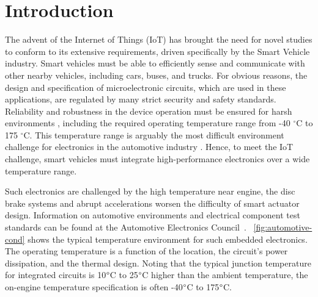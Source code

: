 
\chapter{Introduction}  %

\ifpdf
    \graphicspath{{Chapter1/Figs/Raster/}{Chapter1/Figs/PDF/}{Chapter1/Figs/}}
\else
    \graphicspath{{Chapter1/Figs/Vector/}{Chapter1/Figs/}}
\fi

The advent of the Internet of Things (IoT) has brought the need for novel studies to conform to its extensive requirements, driven specifically by the Smart Vehicle industry.   Smart vehicles must be able to efficiently sense and communicate with other nearby vehicles, including cars, buses, and trucks. For obvious reasons, the design and specification of microelectronic circuits, which are used in these applications, are regulated by many strict security and safety standards. Reliability and robustness in the device operation must be ensured for harsh environments \cite{Ferreira2014}, including the required operating temperature range from -40 $^{\circ}$C to 175 $^{\circ}$C. This temperature range is arguably the most difficult environment challenge for electronics in the automotive industry \cite{Chain1997}. Hence, to meet the IoT challenge, smart vehicles must integrate high-performance electronics over a wide temperature range.

Such electronics are challenged by the high temperature near engine, the disc brake systems and abrupt accelerations worsen the difficulty of smart actuator design. Information on automotive environments and electrical component test standards can be found at the Automotive Electronics Council~\cite{1393072,ISO16750}. \figurename~\ref{fig:automotive-cond} shows the typical temperature environment for such embedded electronics. The operating temperature is a function of the location, the circuit's power dissipation, and the thermal design. Noting that the typical junction temperature for integrated circuits is 10\(\degree \)C to 25\(\degree \)C higher than the ambient temperature, the on-engine temperature specification is often -40\(\degree \)C to 175\(\degree \)C.

